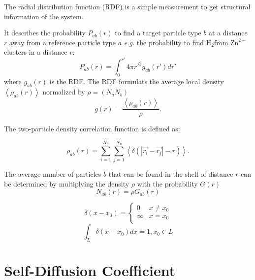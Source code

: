 \documentclass[
  letterpaper,
]{article}
\begin{document}

The radial distribution function (RDF) is a simple measurement to get
structural information of the system.

It describes the probability \(P_{ab}(r)\) to find a target particle
type \(b\) at a distance \(r\) away from a reference particle type \(a\)
\emph{e.g.} the probability to find \(\mathrm{H}_2\)from
\(\mathrm{Zn}^{2+}\) clusters in a distance \(r\): \[
P_{ab}(r) = \int_{0}^{r'} 4\pi r'^2 g_{ab}(r') dr'
\] where \(g_{ab}(r)\) is the RDF. The RDF formulats the average local
density \(\left <\rho_{ab}(r)\right >\) normalized by \(\rho=(N_a N_b)\)
\[
g(r) = \frac{\left <\rho_{ab}(r)\right >}{\rho}.
\]

The two-particle density correlation function is defined as:

\[
\rho_{ab}(r) =\sum_{i=1}^{N_a} \sum_{j=1}^{N_b} \left < \delta(|\vec{r_{i}}-\vec{r_{j}}| -r)\right >.
\]

The average number of particles \(b\) that can be found in the shell of
distance \(r\) can be determined by multiplying the density \(\rho\)
with the probability \(G(r)\) \[ 
N_{ab}(r) = \rho G_{ab}(r)
\]

\begin{tcolorbox}[enhanced jigsaw, opacitybacktitle=0.6, colback=white, rightrule=.15mm, bottomrule=.15mm, coltitle=black, toprule=.15mm, bottomtitle=1mm, arc=.35mm, colframe=quarto-callout-tip-color-frame, opacityback=0, toptitle=1mm, breakable, titlerule=0mm, left=2mm, title=\textcolor{quarto-callout-tip-color}{\faLightbulb}\hspace{0.5em}{Dirc-Delta Function}, leftrule=.75mm, colbacktitle=quarto-callout-tip-color!10!white]

\[
\delta(x-x_0) =  \begin{cases}
      0        & x \neq x_0\\
      \infty & x = x_0\\
    \end{cases}   
\] \[
\int_L \delta(x-x_0) dx = 1, x_0 \in L
\]

\end{tcolorbox}

\hypertarget{self-diffusion-coefficient}{%
\section*{Self-Diffusion Coefficient}\label{self-diffusion-coefficient}}
\end{document}
